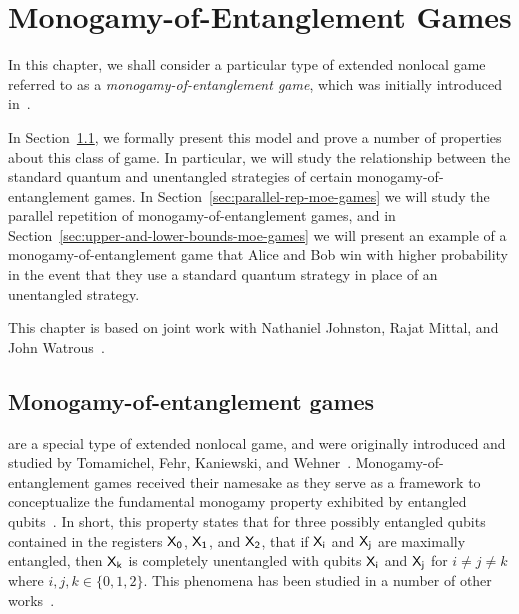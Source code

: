 \chapter{Monogamy-of-Entanglement Games}
\label{chap:monogamy_games}
In this chapter, we shall consider a particular type of extended nonlocal game referred to as a \emph{monogamy-of-entanglement game}, which was initially introduced in~\cite{Tomamichel2013}. 

In Section~\ref{sec:monogamy-of-entanglement-games}, we formally present this model and prove a number of properties about this class of game. In particular, we will study the relationship between the standard quantum and unentangled strategies of certain monogamy-of-entanglement games. In Section~\ref{sec:parallel-rep-moe-games} we will study the parallel repetition of monogamy-of-entanglement games, and in Section~\ref{sec:upper-and-lower-bounds-moe-games} we will present an example of a monogamy-of-entanglement game that Alice and Bob win with higher probability in the event that they use a standard quantum strategy in place of an unentangled strategy. 

This chapter is based on joint work with Nathaniel Johnston, Rajat Mittal, and John Watrous~\cite{Johnston2015a}.

\minitoc

\section{Monogamy-of-entanglement games}
\label{sec:monogamy-of-entanglement-games}

 are a special type of extended nonlocal game, and were originally introduced and studied by Tomamichel, Fehr, Kaniewski, and Wehner~\cite{Tomamichel2013}. Monogamy-of-entanglement games received their namesake as they serve as a framework to conceptualize the fundamental monogamy property exhibited by entangled qubits~\cite{Coffman2000}. In short, this property states that for three possibly entangled qubits contained in the registers $\mathsf{X_0}$, $\mathsf{X_1}$, and $\mathsf{X_2}$, that if $\mathsf{X_i}$ and $\mathsf{X_j}$ are maximally entangled, then $\mathsf{X_k}$ is completely unentangled with qubits $\mathsf{X_i}$ and $\mathsf{X_j}$ for $i \not= j \not= k$ where $i,j,k \in \{0,1,2\}$. This phenomena has been studied in a number of other works~\cite{Terhal2001, Terhal2004, Koashi2004, Osborne2006}.

